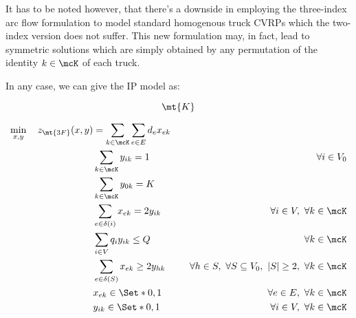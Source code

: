 It has to be noted however, that there's a downside in employing the three-index arc flow formulation to model standard homogenous truck CVRPs which the two-index version does not suffer.
This new formulation may, in fact, lead to symmetric solutions which are simply obtained by any permutation of the identity $k \in \mcK$ of each truck.

In any case, we can give the IP model as:

$$
	\mt{K}
$$

\begin{align}
	\min_{x, y} \quad z_\mt{3F}(x, y) & = \sum_{k \in \mcK} \sum_{e \in E} d_{e} x_{ek} \label{eq:three-index-flow-obj-func}                                                                                                                          \\
	                                  & \sum_{k \in \mcK} y_{ik} = 1                                                         & \quad \forall i \in V_0                                              \label{eq:three-index-flow-all-customers-visited} \\
	                                  & \sum_{k \in \mcK} y_{0k} = K                                                         & \label{eq:three-index-flow-tour-starts-and-ends-at-depot}                                                              \\
	                                  & \sum_{e \in \delta(i)} x_{ek} = 2 y_{ik}                                             & \quad \forall i \in V,\ \forall k \in \mcK \label{eq:three-index-flow-force-visited-customer-if-flow}                  \\
	                                  & \sum_{i \in V} q_i y_{ik} \le Q                                                      & \quad \forall k \in \mcK \label{eq:three-index-flow-force-resource-upper-bound}                                        \\
	                                  & \sum_{e \in \delta(S)} x_{ek} \ge 2 y_{hk}                                           & \quad \forall h \in S,\ \forall S \subseteq V_0,\ |S| \ge 2,\ \forall k \in \mcK \label{eq:three-index-flow-secv1}     \\
	                                  & x_{ek}                   \in \Set*{0, 1}                                             & \quad \forall e \in E,\ \forall k \in \mcK             \label{eq:three-index-flow-x-mip-var-bounds}                    \\
	                                  & y_{ik}                    \in \Set*{0, 1}                                            & \quad \forall i \in V,\ \forall k \in \mcK  \label{eq:three-index-flow-y-mip-var-bounds}
\end{align}

